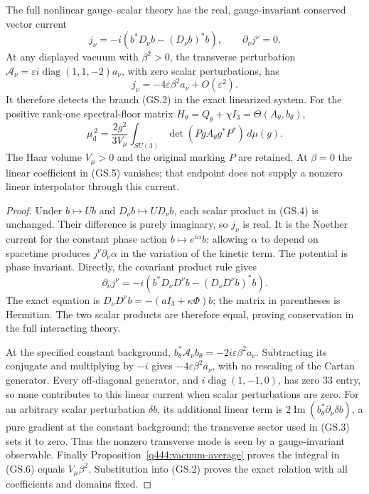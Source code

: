 \begin{proposition}
\label{q444:current-mass}
The full nonlinear gauge--scalar theory has the real, gauge-invariant
conserved vector current
\[
 j_\nu=-i\left(b^*D_\nu b-(D_\nu b)^*b\right),\qquad
 \partial_\nu j^\nu=0.                                      \tag{GS.4}
\]
At any displayed vacuum with $\beta^2>0$, the transverse perturbation
$\mathcal A_\nu=\varepsilon i\operatorname{diag}(1,1,-2)a_\nu$,
with zero scalar perturbations, has
\[
 j_\nu=-4\varepsilon\beta^2 a_\nu+O(\varepsilon^2).
                                                               \tag{GS.5}
\]
It therefore detects the branch (GS.2) in the exact linearized system.
For the positive rank-one spectral-floor matrix
$H_\theta=Q_\theta+\chi I_3=\Theta(A_\theta,b_\theta)$,
\[
 \boxed{\displaystyle
 \mu_{\mathrm d}^{\,2}
 =\frac{2g^2}{3V_\mu}
       \int_{SU(3)}\det(PgA_\theta g^*P^*)\,d\mu(g).}          \tag{GS.6}
\]
The Haar volume $V_\mu>0$ and the original marking $P$ are retained.
At $\beta=0$ the linear coefficient in (GS.5) vanishes; that endpoint
does not supply a nonzero linear interpolator through this current.
\end{proposition}
\begin{proof}
Under $b\mapsto Ub$ and $D_\nu b\mapsto U D_\nu b$, each scalar product
in (GS.4) is unchanged. Their difference is purely imaginary, so $j_\nu$
is real. It is the Noether current for the constant phase action
$b\mapsto e^{i\alpha}b$: allowing $\alpha$ to depend on spacetime
produces $j^\nu\partial_\nu\alpha$ in the variation of the kinetic term.
The potential is phase invariant. Directly, the covariant product rule
gives
\[
 \partial_\nu j^\nu
 =-i\left(b^*D_\nu D^\nu b-(D_\nu D^\nu b)^*b\right).
\]
The exact equation is $D_\nu D^\nu b=-(aI_3+\kappa\Phi)b$;
the matrix in parentheses is Hermitian. The two scalar products
are therefore equal, proving conservation in the full interacting theory.

At the specified constant background,
$b_\theta^*\mathcal A_\nu b_\theta
=-2i\varepsilon\beta^2a_\nu$. Subtracting its conjugate and multiplying
by $-i$ gives $-4\varepsilon\beta^2a_\nu$, with no rescaling of the
Cartan generator. Every off-diagonal generator, and
$i\operatorname{diag}(1,-1,0)$, has zero $33$ entry, so none contributes
to this linear current when scalar perturbations are zero.
For an arbitrary scalar perturbation $\delta b$, its additional linear
term is $2\operatorname{Im}(b_\theta^*\partial_\nu\delta b)$,
a pure gradient at the constant background; the transverse sector
used in (GS.3) sets it to zero. Thus the nonzero transverse mode is
seen by a gauge-invariant observable.
Finally Proposition~\ref{q444:vacuum-average} proves the integral in
(GS.6) equals $V_\mu\beta^2$. Substitution into (GS.2) proves the
exact relation with all coefficients and domains fixed.
\end{proof}

